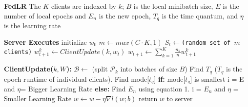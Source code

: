 \documentclass[conference]{IEEEtran}
\begin{document}
\begin{algorithm}[H]
	\scriptsize
	\caption{ \textbf{FedLR} The $K$ clients are
		indexed by $k$; $B$ is the local minibatch size, $E$ is the number
		of local epochs and $E_n$ is the new epoch, $T_q$ is the time quantum, and $\eta$ is the learning rate}\label{alg:cap}
	\begin{algorithmic}[1]
		
		\State \textbf{Server Executes}
		\State initialize $w_0$
		\State \texttt{$m \gets max(C\cdot K,1)$}
		\State \texttt{$S_t \gets $(random set of $m$ clients)}
		\State $w_{t+1}^{k} \gets ClientUpdate(k,w_t)$
		\EndFor
		\State $w_{t+1} \gets \sum_{k=1}^{K} \frac{n_k}{n} w_{t+1}^{k}$
		
		\EndFor
		\State \textbf{ClientUpdate($k,W$):} 
		\State $\mathcal{B} \gets$ (split $\mathcal{P}_k$ into batches of size $B$)
		\State Find $T_q$ ($T_q$ is the epoch runtime of individual clients).
		\State Find mode[$t_q$]
		\State \textbf{if:} mode[$t_q$] is smallest 
		\State \hspace{.3cm} i = E and $\eta$= Bigger Learning Rate
		\State \textbf{else:} 
		\State \hspace{.3cm} Find $E_n$ using equation 1. 
		\State \hspace{.3cm} i = $E_n$ and $\eta$ = Smaller Learning Rate
		\State $w \gets w - \eta \nabla l(w;b)$
		\EndFor
		\EndFor
		\State return $w$ to server
		
	\end{algorithmic}
\end{algorithm}
 
\end{document}

